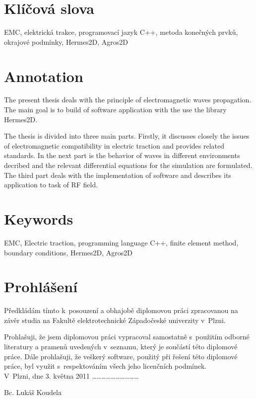 \section*{Klíčová slova}
EMC, elektrická trakce, programovací jazyk C++, metoda konečných prvků, okrajové podmínky, Hermes2D, Agros2D

\bigskip

\section*{Annotation}
The present thesis deals with the principle of electromagnetic waves propagation. The main goal is to build of software application with the use the library Hermes2D.

The thesis is divided into three main parts. Firstly, it discusses closely the issues of electromagnetic compatibility in electric traction and provides related standards.
In the next part is the behavior of waves in different environments decribed and the relevant differential equations for the simulation are formulated. The third part deals with the implementation of software and describes its application to task of RF field.

\section*{Keywords}
EMC, Electric traction, programming language C++, finite element method, boundary conditions, Hermes2D, Agros2D
\newpage

\section*{Prohlášení}
Předkládám tímto k~posouzení a obhajobě diplomovou práci zpracovanou na závěr studia na Fakultě elektrotechnické Západočeské univerzity v~Plzni.

Prohlašuji, že jsem diplomovou práci vypracoval samostatně s~použitím odborné literatury a pramenů uvedených v~seznamu, který je součástí této diplomové práce.
Dále prohlašuji, že veškerý software, použitý při řešení této diplomové práce, byl využit s~respektováním všech jeho licenčních podmínek.\bigskip \bigskip \\

\noindent V~Plzni, dne 3. května 2011 \hfill \ldots \ldots \ldots \ldots \ldots \ldots \ldots \ldots \ldots \ldots
\noindent \begin{flushright}Bc. Lukáš Koudela ~~~~~~~\end{flushright}
\newpage

